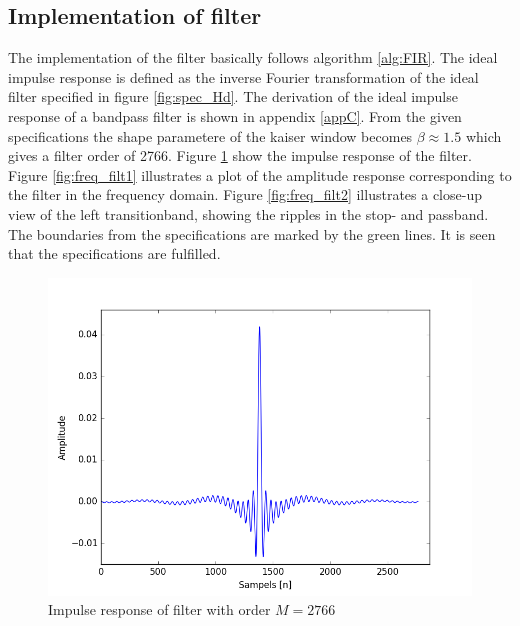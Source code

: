 \subsection{Implementation of filter}
The implementation of the filter basically follows algorithm \ref{alg:FIR}. The ideal impulse response is defined as the inverse Fourier transformation of the ideal filter specified in figure \ref{fig:spec_Hd}. The derivation of the ideal impulse response of a bandpass filter is shown in appendix \ref{appC}. From the given specifications the shape parametere of the kaiser window becomes $\beta \approx 1.5$ which gives a filter order of 2766. Figure \ref{fig:FIRimpulse} show the impulse response of the filter. Figure \ref{fig:freq_filt1} illustrates a plot of the amplitude response corresponding to the filter in the frequency domain. Figure \ref{fig:freq_filt2} illustrates a close-up view of the left transitionband, showing the ripples in the stop- and passband. The boundaries from the specifications are marked by the green lines. It is seen that the specifications are fulfilled. 
\begin{figure}[h]
\centering 
\includegraphics[scale=0.4]{figures/filtertest/impulse.png}
\caption{Impulse response of filter with order $M=2766$}
\label{fig:FIRimpulse}
\end{figure}
       
